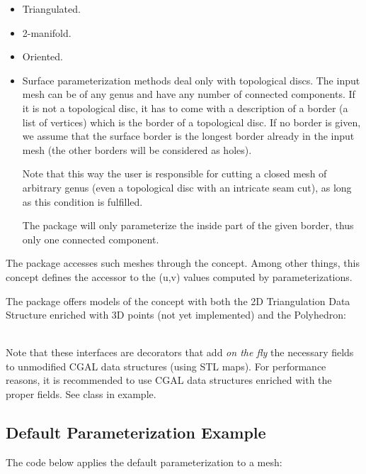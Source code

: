 \begin{itemize}

\item Triangulated.

\item 2-manifold.

\item Oriented.

\item Surface parameterization methods deal only with topological discs.
The input mesh can be of any genus and have any number of connected components.
If it is not a topological disc, it has to come with a description of a border
(a list of vertices) which is the border of a topological disc.
If no border is given, we assume that the surface border
is the longest border already in the input mesh (the other borders will
be considered as holes).

Note that this way the user is responsible for cutting a closed mesh of
arbitrary genus (even a topological disc with an intricate seam
cut), as long as this condition is fulfilled.

The package will only parameterize the inside part of the given border,
thus only one connected component.

\end{itemize}

The package accesses such meshes through the  concept. Among other
things, this concept defines the accessor to the (u,v) values computed
by parameterizations.

The package offers models of the concept
 with both the 2D Triangulation Data Structure enriched
with 3D points (not yet implemented) and the Polyhedron:

  \\

Note that these interfaces are decorators that add {\em on the fly} the necessary
fields to unmodified CGAL data structures (using STL maps).
For performance reasons, it is recommended to use CGAL data structures
enriched with the proper fields.
See  class in  example.


\subsection{Default Parameterization Example}

The code below applies the default parameterization to a  mesh:

